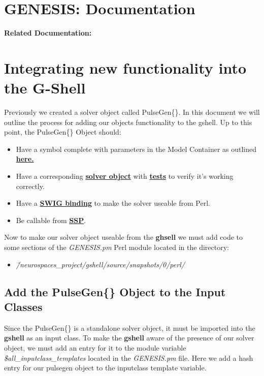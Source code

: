 \documentclass[12pt]{article}
\begin{document}
\section*{GENESIS: Documentation}

{\bf Related Documentation:}

\section*{Integrating new functionality into the G-Shell}

Previously we created a solver object called PulseGen\{\}. In this document we will outline the process for adding our objects functionality to the gshell. Up to this point, the PulseGen\{\} Object should:

\begin{itemize}
\item[] Have a symbol complete with parameters in the Model Container as outlined \href{../genesis-extend-model-container/genesis-extend-model-container.tex}{\bf here.}
\item[] Have a corresponding \href{../genesis-add-object-solver/genesis-add-object-solver.tex}{\bf solver object} with \href{../genesis-create-test-heccer/genesis-create-test-heccer.tex}{\bf tests} to verify it's working correctly.
\item[] Have a \href{../genesis-add-swigbinding-heccer/genesis-add-swigbinding-heccer.tex}{\bf SWIG binding} to make the solver useable from Perl.
\item[] Be callable from \href{../genesis-add-feature-ssp.tex}{\bf SSP}.
\end{itemize} 

Now to make our solver object useable from the {\bf ghsell} we must add code to some sections of the {\it GENESIS.pm} Perl module located in the directory:


\begin{itemize}
\item[] {\it \~/neurospaces\_project/gshell/source/snapshots/0/perl/}
\end{itemize}


\subsection*{Add the PulseGen\{\} Object to the Input Classes}

Since the PulseGen\{\} is a standalone solver object, it must be imported into the {\bf gshell} as an input class. To make the {\bf gshell} aware of the presence of our solver object, we must add an entry for it to the module variable {\it \$all\_inputclass\_templates} located in the {\it GENESIS.pm} file. Here we add a hash entry for our pulsegen object to the inputclass template variable. 
\end{document}
